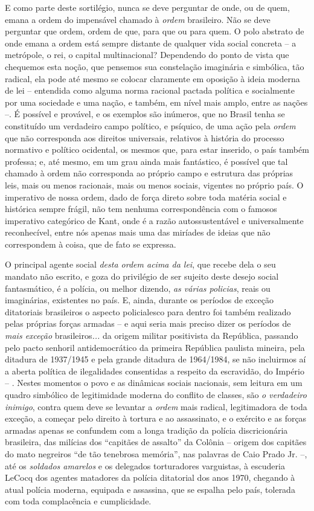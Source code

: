 E como parte deste sortilégio, nunca se deve perguntar de onde, ou de
quem, emana a ordem do impensável chamado à \emph{ordem} brasileiro. Não
se deve perguntar que ordem, ordem de que, para que ou para quem. O polo
abstrato de onde emana a ordem está sempre distante de qualquer vida
social concreta -- a metrópole, o rei, o capital multinacional?
Dependendo do ponto de vista que chequemos esta noção, que pensemos sua
constelação imaginária e simbólica, tão radical, ela pode até mesmo se
colocar claramente em oposição à ideia moderna de lei -- entendida como
alguma norma racional pactada política e socialmente por uma sociedade e
uma nação, e também, em nível mais amplo, entre as nações --. É possível
e provável, e os exemplos são inúmeros, que no Brasil tenha se
constituído um verdadeiro campo político, e psíquico, de uma ação pela
\emph{ordem} que não corresponda aos direitos universais, relativos à
história do processo normativo e político ocidental, os mesmos que, para
estar inserido, o país também professa; e, até mesmo, em um grau ainda
mais fantástico, é possível que tal chamado à ordem não corresponda ao
próprio campo e estrutura das próprias leis, mais ou menos racionais,
mais ou menos sociais, vigentes no próprio país. O imperativo de nossa
ordem, dado de força direto sobre toda matéria social e histórica sempre
frágil, não tem nenhuma correspondência com o famosos imperativo
categórico de Kant, onde é a razão autossustentável e universalmente
reconhecível, entre nós apenas mais uma das miríades de ideias que não
correspondem à coisa, que de fato se expressa.

O principal agente social \emph{desta ordem acima da lei}, que recebe
dela o seu mandato não escrito, e goza do privilégio de ser sujeito
deste desejo social fantasmático, é a polícia, ou melhor dizendo,
\emph{as várias policias}, reais ou imaginárias, existentes no país. E,
ainda, durante os períodos de exceção ditatoriais brasileiros o aspecto
policialesco para dentro foi também realizado pelas próprias forças
armadas -- e aqui seria mais preciso dizer os períodos de \emph{mais
exceção} brasileiros\emph{...} da origem militar positivista da
República, passando pelo pacto senhoril antidemocrático da primeira
República paulista mineira, pela ditadura de 1937/1945 e pela grande
ditadura de 1964/1984, se não incluirmos aí a aberta política de
ilegalidades consentidas a respeito da escravidão, do Império -- .
Nestes momentos o povo e as dinâmicas sociais nacionais, sem leitura em
um quadro simbólico de legitimidade moderna do conflito de classes, são
\emph{o verdadeiro inimigo}, contra quem deve se levantar a \emph{ordem}
mais radical, legitimadora de toda exceção, a começar pelo direito à
tortura e ao assassinato, e o exército e as forças armadas apenas se
confundem com a longa tradição da polícia discricionária brasileira, das
milícias dos ``capitães de assalto'' da Colônia -- origem dos capitães
do mato negreiros ``de tão tenebrosa memória'', nas palavras de Caio
Prado Jr. --, até os \emph{soldados amarelos} e os delegados
torturadores varguistas, à escuderia LeCocq dos agentes matadores da
polícia ditatorial dos anos 1970, chegando à atual polícia moderna,
equipada e assassina, que se espalha pelo país, tolerada com toda
complacência e cumplicidade.

